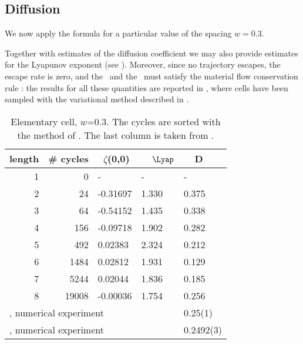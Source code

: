 {\subsection{Diffusion}

We now apply the formula  for a particular value of the
spacing $w=0.3$.

Together with estimates of the diffusion coefficient we may also
provide estimates for the Lyapunov exponent (see
).  Moreover, since no trajectory escapes, the
escape rate is zero, and the \Fd\ and the \dzeta\ must satisfy the
material flow conservation rule : the results for all
these quantities are reported in , where cells have
been sampled with the variational method described in
.
%
\begin{table}
\caption[]{\small
Elementary cell, $w$=0.3.
The cycles are sorted with the
method of .
The last column is taken from .
}
{\small
\begin{tabular}{rrlll}
\hline
length & \# cycles & ~$\zeta$(0,0) & ~~$\Lyap$ & ~~D \\ \hline
1      & 0      &   -    &   -  &   - \\
2      & 24     & -0.31697 & 1.330 & 0.375 \\
3      & 64     & -0.54152 & 1.435 & 0.338 \\
4      & 156    & -0.09718 & 1.902 & 0.282 \\
5      & 492    &  0.02383 & 2.324 & 0.212 \\
6      & 1484   &  0.02812 & 1.931 & 0.129 \\
7      & 5244   &  0.02044 & 1.836 & 0.185 \\
8      & 19008  & -0.00036 & 1.754 & 0.256 \\ \hline
\multicolumn{4}{l}{{MZ}, numerical experiment} & 0.25(1) \\
\multicolumn{4}{l}{{MR94}, numerical experiment} & 0.2492(3)
\end{tabular}
}  %
\label{t-diff-3}
\end{table}
%

}
